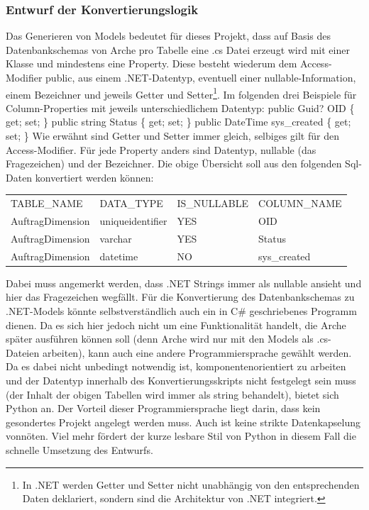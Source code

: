 \documentclass[11pt,toc=sectionentrywithoutdots, 
headheight=44pt, headings=optiontoheadandtoc, hyperfootnotes=false, hypertexnames=false]{scrartcl}
\begin{document}
\subsubsection{Entwurf der Konvertierungslogik}
Das Generieren von Models bedeutet für dieses Projekt, dass auf Basis des Datenbankschemas von Arche pro Tabelle eine .cs Datei erzeugt wird mit einer Klasse und mindestens eine Property. Diese besteht wiederum dem \gls{Access-Modifier} \glqq public\grqq{}, aus einem .NET-Datentyp, eventuell einer nullable-Information, einem Bezeichner und jeweils Getter und Setter\footnote{In .NET werden Getter und Setter nicht unabhängig von den entsprechenden Daten deklariert, sondern sind die Architektur von .NET integriert.}. Im folgenden drei Beispiele für Column-Properties mit jeweils unterschiedlichem Datentyp:
\newline\newline
public Guid? OID \{ get; set; \}\newline  
public string Status \{ get; set; \}\newline
public DateTime sys\_created \{ get; set; \}\newline\newline
Wie erwähnt sind Getter und Setter immer gleich, selbiges gilt für den Access-Modifier. Für jede Property anders sind Datentyp, nullable (das Fragezeichen) und der Bezeichner. Die obige Übersicht soll aus den folgenden Sql-Daten konvertiert werden können:\newline
\begin{table}[ht]
    
    \begin{tabular}{l|l|l|l}
        TABLE\_NAME & DATA\_TYPE & IS\_NULLABLE  & COLUMN\_NAME  \\
        AuftragDimension & uniqueidentifier & YES  & OID  \\
        AuftragDimension & varchar & YES  & Status  \\
        AuftragDimension & datetime & NO  & sys\_created  \\
    \end{tabular}
\end{table}\linebreak
Dabei muss angemerkt werden, dass .NET Strings immer als nullable ansieht und hier das Fragezeichen wegfällt. Für die Konvertierung des Datenbankschemas zu .NET-Models könnte selbstverständlich auch ein in C\# geschriebenes Programm dienen. Da es sich hier jedoch nicht um eine Funktionalität handelt, die Arche später ausführen können soll (denn Arche wird nur mit den Models als .cs-Dateien arbeiten), kann auch eine andere Programmiersprache gewählt werden. Da es dabei nicht unbedingt notwendig ist, komponentenorientiert zu arbeiten und der Datentyp innerhalb des Konvertierungsskripts nicht festgelegt sein muss (der Inhalt der obigen Tabellen wird immer als string behandelt), bietet sich Python an. Der Vorteil dieser Programmiersprache liegt darin, dass kein gesondertes Projekt angelegt werden muss. Auch ist keine strikte Datenkapselung vonnöten. Viel mehr fördert der kurze lesbare Stil von Python in diesem Fall die schnelle Umsetzung des Entwurfs.
\end{document}

